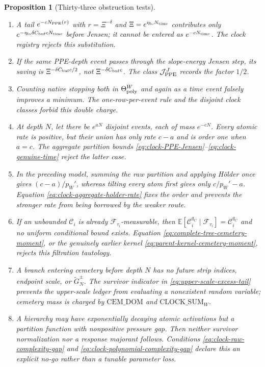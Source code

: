 \documentclass[11pt]{article}
\newtheorem{proposition}[theorem]{Proposition}
\begin{document}
\begin{proposition}[Thirty-three obstruction tests]
\begin{enumerate}[label=\textup{(T\arabic*)}]
      predictable $\mathcal C_i$ and
      Lemma~\ref{lem:stopped-source-propagation} charge that expansion before
      the cemetery transition.
\item A tail $e^{-cN_{\rm PPE}(r)}$ with $r=\Xi^{-\delta}$ and
      $\Xi=e^{\eta_{\rm lo}N_{\rm time}}$ contributes only
      $e^{-\eta_{\rm lo}\delta C_{\rm buf}cN_{\rm time}}$ before Jensen; it
      cannot be entered as $e^{-cN_{\rm time}}$.  The clock registry rejects
      this substitution.
\item If the same PPE-depth event passes through the slope-energy Jensen
      step, its saving is
      $\Xi^{-\delta C_{\rm buf}c/2}$, not
      $\Xi^{-\delta C_{\rm buf}c}$.  The class
      $\mathcal J_{\rm PPE}^{J}$ records the factor $1/2$.
\item Counting native stopping both in $\Theta_{\rm poly}^{W}$ and again as
      a time event falsely improves a minimum.  The one-row-per-event rule
      and the disjoint clock classes forbid this double charge.
\item At depth $N$, let there be $e^{aN}$ disjoint events, each of mass
      $e^{-cN}$.  Every atomic rate is positive, but their union has only
      rate $c-a$ and is order one when $a=c$.  The aggregate partition bounds
      \eqref{eq:clock-PPE-Jensen}--\eqref{eq:clock-genuine-time} reject the
      latter case.
\item In the preceding model, summing the raw partition and applying
      H\"older once gives $(c-a)/p_W'$, whereas tilting every atom first gives
      only $c/p_W'-a$.  Equation \eqref{eq:clock-aggregate-holder-rate}
      fixes the order and prevents the stronger rate from being borrowed by
      the weaker route.
\item If an unbounded $\mathcal C_i$ is already
      $\mathcal F_{\tau_i}$-measurable, then
      $\mathbb E[\mathcal C_i^{q_C}\mid\mathcal F_{\tau_i}]
      =\mathcal C_i^{q_C}$ and no uniform conditional bound exists.
      Equation \eqref{eq:complete-tree-cemetery-moment}, or the genuinely
      earlier kernel \eqref{eq:parent-kernel-cemetery-moment}, rejects this
      filtration tautology.
\item A branch entering cemetery before depth $N$ has no future strip indices,
      endpoint scale, or $\widetilde G_N^\pm$.  The survivor indicator in
      \eqref{eq:upper-scale-excess-tail} prevents the upper-scale ledger from
      evaluating a nonexistent random variable; cemetery mass is charged by
      $\mathrm{CEM\_DOM}$ and $\mathrm{CLOCK\_SUM}_{W}$.
\item A hierarchy may have exponentially decaying atomic activations but a
      partition function with nonpositive pressure gap.  Then neither
      survivor normalization nor a response majorant follows.  Conditions
      \eqref{eq:clock-raw-complexity-gap} and
      \eqref{eq:clock-polynomial-complexity-gap} declare this an explicit
      no-go rather than a tunable parameter loss.
\end{enumerate}
\end{proposition}
\end{document}
